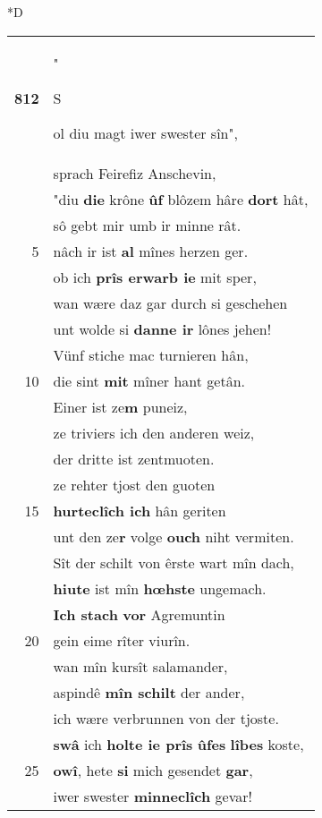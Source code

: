 \documentclass[8pt,a4paper,notitlepage]{article}
\begin{document}
\begin{table}[ht]
\begin{minipage}[t]{0.5\linewidth}
\small
\begin{center}*D
\end{center}
\begin{tabular}{rl}
\textbf{812} & "\begin{large}S\end{large}ol diu magt iwer swester sîn",\\ 
 & sprach Feirefiz Anschevin,\\ 
 & "diu \textbf{die} krône \textbf{ûf} blôzem hâre \textbf{dort} hât,\\ 
 & sô gebt mir umb ir minne rât.\\ 
5 & nâch ir ist \textbf{al} mînes herzen ger.\\ 
 & ob ich \textbf{prîs erwarb ie} mit sper,\\ 
 & wan wære daz gar durch si geschehen\\ 
 & unt wolde si \textbf{danne ir} lônes jehen!\\ 
 & Vünf stiche mac turnieren hân,\\ 
10 & die sint \textbf{mit} mîner hant getân.\\ 
 & Einer ist ze\textbf{m} puneiz,\\ 
 & ze triviers ich den anderen weiz,\\ 
 & der dritte ist zentmuoten.\\ 
 & ze rehter tjost den guoten\\ 
15 & \textbf{hurteclîch ich} hân geriten\\ 
 & unt den ze\textbf{r} volge \textbf{ouch} niht vermiten.\\ 
 & Sît der schilt von êrste wart mîn dach,\\ 
 & \textbf{hiute} ist mîn \textbf{hœhste} ungemach.\\ 
 & \textbf{Ich stach} \textbf{vor} Agremuntin\\ 
20 & gein eime rîter viurîn.\\ 
 & wan mîn kursît salamander,\\ 
 & aspindê \textbf{mîn schilt} der ander,\\ 
 & ich wære verbrunnen von der tjoste.\\ 
 & \textbf{swâ} ich \textbf{holte ie prîs} \textbf{ûfes} \textbf{lîbes} koste,\\ 
25 & \textbf{owî}, hete \textbf{si} mich gesendet \textbf{gar},\\ 
 & iwer swester \textbf{minneclîch} gevar!\\ 

\end{tabular}
\end{minipage}
\end{table}
\end{document}
